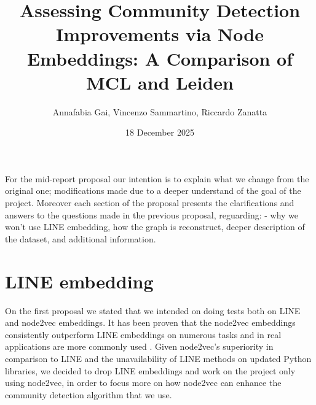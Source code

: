 \documentclass[a4paper,11pt]{article}
\title{Assessing Community Detection Improvements via Node Embeddings: A Comparison of MCL and Leiden}
\author{Annafabia Gai, Vincenzo Sammartino, Riccardo Zanatta}
\date{18 December 2025}
\begin{document}
\maketitle

For the mid-report proposal  our intention is to explain what we change from the original one; modifications made due to a deeper understand
of the goal of the project. Moreover each section of the proposal presents the clarifications and answers to the questions made in the previous proposal, reguarding:
- why we won’t use LINE embedding, how the graph is reconstruct, deeper description of the dataset, and additional information.

\section{LINE embedding}
On the first proposal we stated that we intended on doing tests both on LINE and node2vec embeddings. It has been proven that the node2vec embeddings consistently outperform LINE embeddings on numerous tasks and in real applications are more commonly used \cite{grover2016node2vec}. Given node2vec's superiority in comparison to LINE and the unavailability of LINE methods on updated Python libraries, we decided to drop LINE embeddings and work on the project only using node2vec,
in order to focus more on how node2vec can enhance the community detection algorithm that we use.
\end{document}

